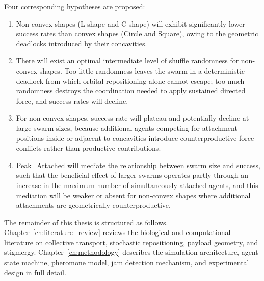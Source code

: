 Four corresponding hypotheses are proposed:

\begin{enumerate}
    \item Non-convex shapes (L-shape and C-shape) will exhibit significantly lower success rates than convex shapes (Circle and Square), owing to the geometric deadlocks introduced by their concavities.
    \item There will exist an optimal intermediate level of shuffle randomness for non-convex shapes. Too little randomness leaves the swarm in a deterministic deadlock from which orbital repositioning alone cannot escape; too much randomness destroys the coordination needed to apply sustained directed force, and success rates will decline.
    \item For non-convex shapes, success rate will plateau and potentially decline at large swarm sizes, because additional agents competing for attachment positions inside or adjacent to concavities introduce counterproductive force conflicts rather than productive contributions.
    \item Peak\_Attached will mediate the relationship between swarm size and success, such that the beneficial effect of larger swarms operates partly through an increase in the maximum number of simultaneously attached agents, and this mediation will be weaker or absent for non-convex shapes where additional attachments are geometrically counterproductive.
\end{enumerate}

The remainder of this thesis is structured as follows. Chapter~\ref{ch:literature_review} reviews the biological and computational literature on collective transport, stochastic repositioning, payload geometry, and stigmergy. Chapter~\ref{ch:methodology} describes the simulation architecture, agent state machine, pheromone model, jam detection mechanism, and experimental design in full detail.
